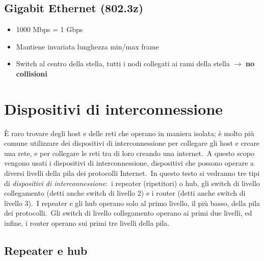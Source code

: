 \subsection{Gigabit Ethernet (802.3z)}

\begin{itemize}
    \item 1000 Mbps = 1 Gbps
    \item Mantiene invariata lunghezza min/max frame
    \item Switch al centro della stella, tutti i nodi collegati ai rami della stella $\rightarrow$ \textbf{no collisioni}
\end{itemize}

\section{Dispositivi di interconnessione}

È raro trovare degli host e delle reti che operano in maniera isolata; è molto più comune utilizzare dei dispositivi di interconnessione per collegare gli host e creare una rete, e per collegare le reti tra di loro creando una internet.\
A questo scopo vengono usati i dispositivi di interconnessione, dispositivi che possono operare a diversi livelli della pila dei protocolli Internet.\
In questo testo si vedranno tre tipi di \emph{dispositivi di interconnessione}:\ i repeater (ripetitori) o hub, gli switch di livello collegamento (detti anche switch di livello 2) e i router (detti anche switch di livello 3).\
I repeater e gli hub operano solo al primo livello, il più basso, della pila dei protocolli.\
Gli switch di livello collegamento operano ai primi due livelli, ed infine, i router operano sui primi tre livelli della pila.

\subsection{Repeater e hub}

